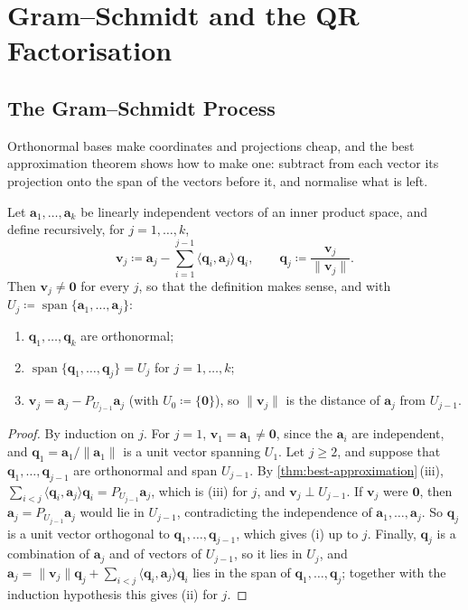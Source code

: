 \section{Gram--Schmidt and the QR Factorisation}
\label{sec:gram-schmidt}

\subsection{The Gram--Schmidt Process}

Orthonormal bases make coordinates and projections cheap, and the best approximation theorem shows how to make one: subtract from each vector its projection onto the span of the vectors before it, and normalise what is left.

\begin{theorem}
\label{thm:gram-schmidt}
Let $\mathbf a_1,\ldots,\mathbf a_k$ be linearly independent vectors of an inner product space, and define recursively, for $j=1,\ldots,k$,
\[
\mathbf v_j\coloneqq\mathbf a_j-\sum_{i=1}^{j-1}\langle\mathbf q_i,\mathbf a_j\rangle\,\mathbf q_i,\qquad\mathbf q_j\coloneqq\frac{\mathbf v_j}{\|\mathbf v_j\|} .
\]
Then $\mathbf v_j\ne\mathbf 0$ for every $j$, so that the definition makes sense, and with $U_j\coloneqq\operatorname{span}\{\mathbf a_1,\ldots,\mathbf a_j\}$:
\begin{enumerate}
\item $\mathbf q_1,\ldots,\mathbf q_k$ are orthonormal;
\item $\operatorname{span}\{\mathbf q_1,\ldots,\mathbf q_j\}=U_j$ for $j=1,\ldots,k$;
\item $\mathbf v_j=\mathbf a_j-P_{U_{j-1}}\mathbf a_j$ (with $U_0\coloneqq\{\mathbf 0\}$), so $\|\mathbf v_j\|$ is the distance of $\mathbf a_j$ from $U_{j-1}$.
\end{enumerate}
\end{theorem}

\begin{proof}
By induction on $j$. For $j=1$, $\mathbf v_1=\mathbf a_1\ne\mathbf 0$, since the $\mathbf a_i$ are independent, and $\mathbf q_1=\mathbf a_1/\|\mathbf a_1\|$ is a unit vector spanning $U_1$. Let $j\ge2$, and suppose that $\mathbf q_1,\ldots,\mathbf q_{j-1}$ are orthonormal and span $U_{j-1}$. By \cref{thm:best-approximation}\,(iii), $\sum_{i<j}\langle\mathbf q_i,\mathbf a_j\rangle\mathbf q_i=P_{U_{j-1}}\mathbf a_j$, which is (iii) for $j$, and $\mathbf v_j\perp U_{j-1}$. If $\mathbf v_j$ were $\mathbf 0$, then $\mathbf a_j=P_{U_{j-1}}\mathbf a_j$ would lie in $U_{j-1}$, contradicting the independence of $\mathbf a_1,\ldots,\mathbf a_j$. So $\mathbf q_j$ is a unit vector orthogonal to $\mathbf q_1,\ldots,\mathbf q_{j-1}$, which gives (i) up to $j$. Finally, $\mathbf q_j$ is a combination of $\mathbf a_j$ and of vectors of $U_{j-1}$, so it lies in $U_j$, and $\mathbf a_j=\|\mathbf v_j\|\mathbf q_j+\sum_{i<j}\langle\mathbf q_i,\mathbf a_j\rangle\mathbf q_i$ lies in the span of $\mathbf q_1,\ldots,\mathbf q_j$; together with the induction hypothesis this gives (ii) for $j$.
\end{proof}

